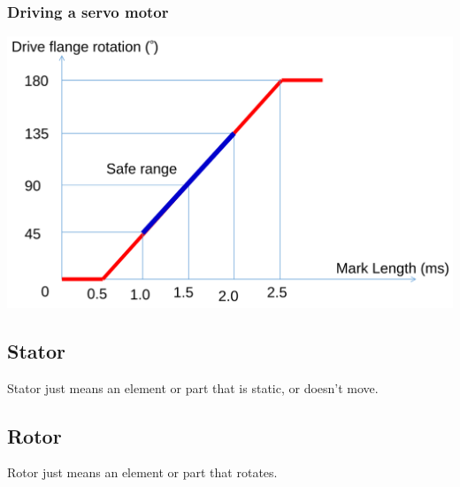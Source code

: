 \documentclass[11pt]{article}
\begin{document}
\subsubsection{Driving a servo motor}
\label{sec:org7521474}
\begin{center}
\includegraphics[width=.9\linewidth]{./images/driving-a-servo-motor.png}
\end{center}

\subsection{Stator}
\label{sec:orgec836d9}
Stator just means an element or part that is static, or doesn't move.

\subsection{Rotor}
\label{sec:orgfbee16f}
Rotor just means an element or part that rotates.
\end{document}
